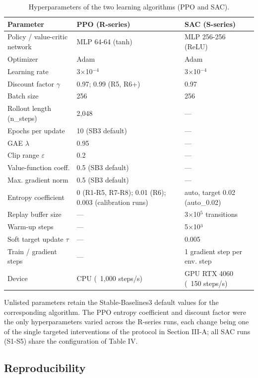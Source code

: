 \documentclass[11pt,a4paper]{article}
\begin{document}
\begin{table}[!ht]
\centering
\caption{Hyperparameters of the two learning algorithms (PPO and SAC).}
\label{tab:hyperparams}
\vspace{1ex}
\begin{tabular}{lll}
\toprule
\textbf{Parameter} & \textbf{PPO (R-series)} & \textbf{SAC (S-series)} \\
\midrule
Policy / value-critic network & MLP 64-64 (tanh) & MLP 256-256 (ReLU) \\
Optimizer & Adam & Adam \\
Learning rate & 3$\times$10$^{-4}$ & 3$\times$10$^{-4}$ \\
Discount factor $\gamma$ & 0.97; 0.99 (R5, R6+) & 0.97 \\
Batch size & 256 & 256 \\
Rollout length (n\_steps) & 2,048 & --- \\
Epochs per update & 10 (SB3 default) & --- \\
GAE $\lambda$ & 0.95 & --- \\
Clip range $\varepsilon$ & 0.2 & --- \\
Value-function coeff. & 0.5 (SB3 default) & --- \\
Max. gradient norm & 0.5 (SB3 default) & --- \\
Entropy coefficient & 0 (R1-R5, R7-R8); 0.01 (R6); 0.003 (calibration runs) & auto, target 0.02 (auto\_0.02) \\
Replay buffer size & --- & 3$\times$10$^5$ transitions \\
Warm-up steps & --- & 5$\times$10³ \\
Soft target update $\tau$ & --- & 0.005 \\
Train / gradient steps & --- & 1 gradient step per env. step \\
Device & CPU (~1,000 steps/s) & GPU RTX 4060 (~150 steps/s) \\
\bottomrule
\end{tabular}
\end{table}

Unlisted parameters retain the Stable-Baselines3 default values for the corresponding algorithm. The PPO entropy coefficient and discount factor were the only hyperparameters varied across the R-series runs, each change being one of the single targeted interventions of the protocol in Section III-A; all SAC runs (S1-S5) share the configuration of Table IV.


\subsection{Reproducibility}
\end{document}
